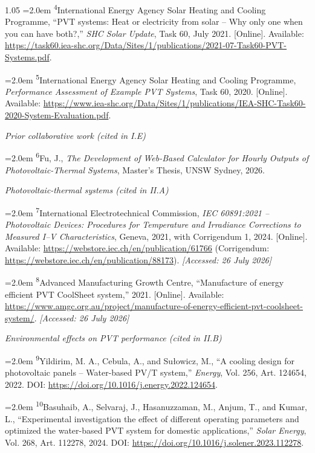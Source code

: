 \documentclass[12pt,letterpaper]{article}
\DeclareRobustCommand{\refanchor}[1]{\hypertarget{ref:#1}{#1}} %
\newcommand{\referenceheading}[1]{\vspace{1.55em}\textit{#1}\par\vspace{0.45em}}
\newcommand{\refentry}[1]{\hangindent=2.0em\hangafter=1 #1\par\vspace{0.2em}}
\begin{document}
\begin{spacing}{1.05}
\refentry{
\textsuperscript{\refanchor{4}}International Energy Agency Solar Heating and Cooling Programme, ``PVT systems: Heat or electricity from solar -- Why only one when you can have both?,'' \textit{SHC Solar Update}, Task 60, July 2021. [Online]. Available: \url{https://task60.iea-shc.org/Data/Sites/1/publications/2021-07-Task60-PVT-Systems.pdf}.
}

\refentry{
\textsuperscript{\refanchor{5}}International Energy Agency Solar Heating and Cooling Programme, \textit{Performance Assessment of Example PVT Systems}, Task 60, 2020. [Online]. Available: \url{https://www.iea-shc.org/Data/Sites/1/publications/IEA-SHC-Task60-2020-System-Evaluation.pdf}.
}

\referenceheading{Prior collaborative work (cited in I.E)}

\refentry{
\textsuperscript{\refanchor{6}}Fu, J., \textit{The Development of Web-Based Calculator for Hourly Outputs of Photovoltaic-Thermal Systems}, Master's Thesis, UNSW Sydney, 2026.
}

\referenceheading{Photovoltaic-thermal systems (cited in II.A)}

\refentry{
\textsuperscript{\refanchor{7}}International Electrotechnical Commission, \textit{IEC 60891:2021 -- Photovoltaic Devices: Procedures for Temperature and Irradiance Corrections to Measured I--V Characteristics}, Geneva, 2021, with Corrigendum 1, 2024. [Online]. Available: \url{https://webstore.iec.ch/en/publication/61766} (Corrigendum: \url{https://webstore.iec.ch/en/publication/88173}). \textit{[Accessed: 26 July 2026]}
}

\refentry{
\textsuperscript{\refanchor{8}}Advanced Manufacturing Growth Centre, ``Manufacture of energy efficient PVT CoolSheet system,'' 2021. [Online]. Available: \url{https://www.amgc.org.au/project/manufacture-of-energy-efficient-pvt-coolsheet-system/}. \textit{[Accessed: 26 July 2026]}
}

\referenceheading{Environmental effects on PVT performance (cited in II.B)}

\refentry{
\textsuperscript{\refanchor{9}}Yildirim, M. A., Cebula, A., and Sułowicz, M., ``A cooling design for photovoltaic panels -- Water-based PV/T system,'' \textit{Energy}, Vol. 256, Art. 124654, 2022. DOI: \url{https://doi.org/10.1016/j.energy.2022.124654}.
}

\refentry{
\textsuperscript{\refanchor{10}}Basuhaib, A., Selvaraj, J., Hasanuzzaman, M., Anjum, T., and Kumar, L., ``Experimental investigation the effect of different operating parameters and optimized the water-based PVT system for domestic applications,'' \textit{Solar Energy}, Vol. 268, Art. 112278, 2024. DOI: \url{https://doi.org/10.1016/j.solener.2023.112278}.
}


\end{spacing}
\end{document}
